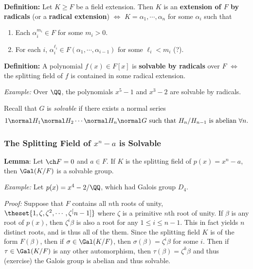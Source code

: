 \textbf{Definition:} Let \(K \geq F\) be a field extension. Then \(K\)
is an \textbf{extension of \(F\) by radicals} (or a \textbf{radical
extension}) \(\iff\) \(K = \alpha_1, \cdots, \alpha_n\) for some
\(\alpha_i\) such that

\begin{enumerate}
\def\labelenumi{\arabic{enumi}.}
\item
  Each \(\alpha_i^{m_i} \in F\) for some \(m_i > 0\).
\item
  For each \(i\),
  \(\alpha_i^{\ell_i} \in F(\alpha_1, \cdots, \alpha_{i-1})\) for some
  \(\ell_i < m_i\) (?).
\end{enumerate}

\textbf{Definition:} A polynomial \(f(x) \in F[x]\) is \textbf{solvable
by radicals} over \(F\) \(\iff\) the splitting field of \(f\) is
contained in some radical extension.

\emph{Example:} Over \(\QQ\), the polynomials \(x^5-1\) and \(x^3-2\)
are solvable by radicals.

Recall that \(G\) is \emph{solvable} if there exists a normal series
\begin{align*}
1 \normal H_1 \normal H_2 \cdots \normal H_n \normal G
\text{ such that } H_n/H_{n-1} \text{ is abelian } \forall n
.\end{align*}

\hypertarget{the-splitting-field-of-xn-a-is-solvable}{%
\subsubsection{\texorpdfstring{The Splitting Field of \(x^n-a\) is
Solvable}{The Splitting Field of x\^{}n-a is Solvable}}\label{the-splitting-field-of-xn-a-is-solvable}}

\textbf{Lemma}: Let \(\ch F = 0\) and \(a\in F\). If \(K\) is the
splitting field of \(p(x) = x^n-a\), then \(\Gal(K/F)\) is a solvable
group.

\emph{Example:} Let \(p(x) = x^4-2 / \QQ\), which had Galois group
\(D_4\).

\emph{Proof:} Suppose that \(F\) contains all \(n\)th roots of unity,
\(\theset{1, \zeta, \zeta^2, \cdots, \zeta^[n-1]}\) where \(\zeta\) is a
primitive \(n\)th root of unity. If \(\beta\) is any root of \(p(x)\),
then \(\zeta^i\beta\) is also a root for any \(1\leq i \leq n-1\). This
in fact yields \(n\) distinct roots, and is thus all of the them. Since
the splitting field \(K\) is of the form \(F(\beta)\), then if
\(\sigma \in \Gal(K/F)\), then \(\sigma(\beta) = \zeta^i \beta\) for
some \(i\). Then if \(\tau \in \Gal(K/F)\) is any other automorphism,
then \(\tau(\beta) = \zeta^k \beta\) and thus (exercise) the Galois
group is abelian and thus solvable.


